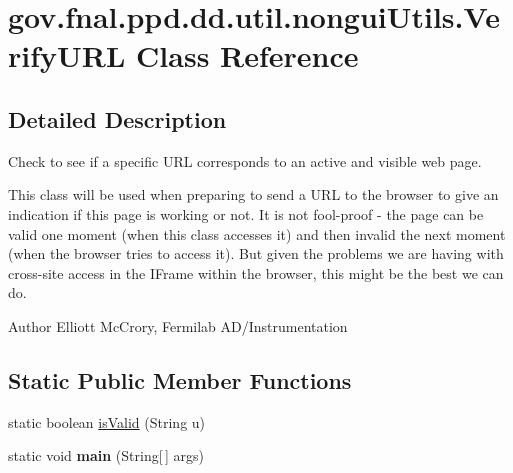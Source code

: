 \hypertarget{classgov_1_1fnal_1_1ppd_1_1dd_1_1util_1_1nonguiUtils_1_1VerifyURL}{\section{gov.\-fnal.\-ppd.\-dd.\-util.\-nongui\-Utils.\-Verify\-U\-R\-L Class Reference}
\label{classgov_1_1fnal_1_1ppd_1_1dd_1_1util_1_1nonguiUtils_1_1VerifyURL}
}


\subsection{Detailed Description}
Check to see if a specific U\-R\-L corresponds to an active and visible web page. 

This class will be used when preparing to send a U\-R\-L to the browser to give an indication if this page is working or not. It is not fool-\/proof -\/ the page can be valid one moment (when this class accesses it) and then invalid the next moment (when the browser tries to access it). But given the problems we are having with cross-\/site access in the I\-Frame within the browser, this might be the best we can do. 

\begin{DoxyAuthor}{Author}
Elliott Mc\-Crory, Fermilab A\-D/\-Instrumentation 
\end{DoxyAuthor}
\subsection*{Static Public Member Functions}
\begin{DoxyCompactItemize}
\item 
static boolean \hyperlink{classgov_1_1fnal_1_1ppd_1_1dd_1_1util_1_1nonguiUtils_1_1VerifyURL_a7bb140c03fe2d3b8c5db95d5125366f0}{is\-Valid} (String u)
\item 
\hypertarget{classgov_1_1fnal_1_1ppd_1_1dd_1_1util_1_1nonguiUtils_1_1VerifyURL_aeb525d904ceb8db0590f2dcb7f0b8b38}{static void {\bfseries main} (String\mbox{[}$\,$\mbox{]} args)}\label{classgov_1_1fnal_1_1ppd_1_1dd_1_1util_1_1nonguiUtils_1_1VerifyURL_aeb525d904ceb8db0590f2dcb7f0b8b38}

\end{DoxyCompactItemize}


